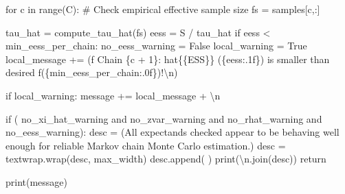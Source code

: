 \documentclass[
  letterpaper,
  DIV=11,
  numbers=noendperiod]{scrartcl}
\newenvironment{Shaded}{\begin{snugshade}}{\end{snugshade}}
\newcommand{\BuiltInTok}[1]{\textcolor[rgb]{0.00,0.23,0.31}{#1}}
\newcommand{\CharTok}[1]{\textcolor[rgb]{0.13,0.47,0.30}{#1}}
\newcommand{\CommentTok}[1]{\textcolor[rgb]{0.37,0.37,0.37}{#1}}
\newcommand{\ControlFlowTok}[1]{\textcolor[rgb]{0.00,0.23,0.31}{#1}}
\newcommand{\DecValTok}[1]{\textcolor[rgb]{0.68,0.00,0.00}{#1}}
\newcommand{\KeywordTok}[1]{\textcolor[rgb]{0.00,0.23,0.31}{#1}}
\newcommand{\NormalTok}[1]{\textcolor[rgb]{0.00,0.23,0.31}{#1}}
\newcommand{\OperatorTok}[1]{\textcolor[rgb]{0.37,0.37,0.37}{#1}}
\newcommand{\SpecialCharTok}[1]{\textcolor[rgb]{0.37,0.37,0.37}{#1}}
\newcommand{\SpecialStringTok}[1]{\textcolor[rgb]{0.13,0.47,0.30}{#1}}
\newcommand{\StringTok}[1]{\textcolor[rgb]{0.13,0.47,0.30}{#1}}
\newcommand{\VariableTok}[1]{\textcolor[rgb]{0.07,0.07,0.07}{#1}}
\begin{document}
\begin{Shaded}
\begin{Highlighting}[]
    \ControlFlowTok{for}\NormalTok{ c }\KeywordTok{in} \BuiltInTok{range}\NormalTok{(C):}
      \CommentTok{\# Check empirical effective sample size}
\NormalTok{      fs }\OperatorTok{=}\NormalTok{ samples[c,:]}
      
\NormalTok{      tau\_hat }\OperatorTok{=}\NormalTok{ compute\_tau\_hat(fs)}
\NormalTok{      eess }\OperatorTok{=}\NormalTok{ S }\OperatorTok{/}\NormalTok{ tau\_hat}
      \ControlFlowTok{if}\NormalTok{ eess }\OperatorTok{\textless{}}\NormalTok{ min\_eess\_per\_chain:}
\NormalTok{        no\_eess\_warning }\OperatorTok{=} \VariableTok{False}
\NormalTok{        local\_warning }\OperatorTok{=} \VariableTok{True}
\NormalTok{        local\_message }\OperatorTok{+=}\NormalTok{ (}\SpecialStringTok{f\textquotesingle{}  Chain }\SpecialCharTok{\{}\NormalTok{c }\OperatorTok{+} \DecValTok{1}\SpecialCharTok{\}}\SpecialStringTok{: hat}\CharTok{\{\{}\SpecialStringTok{ESS}\CharTok{\}\}}\SpecialStringTok{ (}\SpecialCharTok{\{}\NormalTok{eess}\SpecialCharTok{:.1f\}}\SpecialStringTok{) \textquotesingle{}}
                          \StringTok{\textquotesingle{}is smaller than desired \textquotesingle{}}
                          \SpecialStringTok{f\textquotesingle{}(}\SpecialCharTok{\{}\NormalTok{min\_eess\_per\_chain}\SpecialCharTok{:.0f\}}\SpecialStringTok{)!}\CharTok{\textbackslash{}n}\SpecialStringTok{\textquotesingle{}}\NormalTok{)}
    
    \ControlFlowTok{if}\NormalTok{ local\_warning:}
\NormalTok{      message }\OperatorTok{+=}\NormalTok{ local\_message }\OperatorTok{+} \StringTok{\textquotesingle{}}\CharTok{\textbackslash{}n}\StringTok{\textquotesingle{}}
  
  \ControlFlowTok{if}\NormalTok{ (    no\_xi\_hat\_warning }\KeywordTok{and}\NormalTok{ no\_zvar\_warning}
      \KeywordTok{and}\NormalTok{ no\_rhat\_warning   }\KeywordTok{and}\NormalTok{ no\_eess\_warning):}
\NormalTok{    desc }\OperatorTok{=}\NormalTok{ (}\StringTok{\textquotesingle{}All expectands checked appear to be behaving well enough \textquotesingle{}}
            \StringTok{\textquotesingle{}for reliable Markov chain Monte Carlo estimation.\textquotesingle{}}\NormalTok{)}
\NormalTok{    desc }\OperatorTok{=}\NormalTok{ textwrap.wrap(desc, max\_width)}
\NormalTok{    desc.append(}\StringTok{\textquotesingle{} \textquotesingle{}}\NormalTok{)}
    \BuiltInTok{print}\NormalTok{(}\StringTok{\textquotesingle{}}\CharTok{\textbackslash{}n}\StringTok{\textquotesingle{}}\NormalTok{.join(desc))}
    \ControlFlowTok{return}
  
  \BuiltInTok{print}\NormalTok{(message)}
  

\end{Highlighting}
\end{Shaded}
\end{document}
